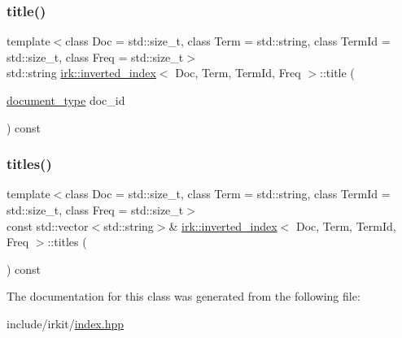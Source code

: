 \mbox{\label{classirk_1_1inverted__index_aa2aa71522e78ec5e29fa30b56c434702}} 
\subsubsection{\texorpdfstring{title()}{title()}}
{\footnotesize\ttfamily template$<$class Doc  = std\+::size\+\_\+t, class Term  = std\+::string, class Term\+Id  = std\+::size\+\_\+t, class Freq  = std\+::size\+\_\+t$>$ \\
std\+::string \mbox{\hyperlink{classirk_1_1inverted__index}{irk\+::inverted\+\_\+index}}$<$ Doc, Term, Term\+Id, Freq $>$\+::title (\begin{DoxyParamCaption}\item[{\mbox{\hyperlink{classirk_1_1inverted__index_ab708a9d1605de705341f3ed81bd7d5e7}{document\+\_\+type}}}]{doc\+\_\+id }\end{DoxyParamCaption}) const\hspace{0.3cm}{\ttfamily [inline]}}

\mbox{\label{classirk_1_1inverted__index_ac3c5100fced55578e115553c8cda9080}} 
\subsubsection{\texorpdfstring{titles()}{titles()}}
{\footnotesize\ttfamily template$<$class Doc  = std\+::size\+\_\+t, class Term  = std\+::string, class Term\+Id  = std\+::size\+\_\+t, class Freq  = std\+::size\+\_\+t$>$ \\
const std\+::vector$<$std\+::string$>$\& \mbox{\hyperlink{classirk_1_1inverted__index}{irk\+::inverted\+\_\+index}}$<$ Doc, Term, Term\+Id, Freq $>$\+::titles (\begin{DoxyParamCaption}{ }\end{DoxyParamCaption}) const\hspace{0.3cm}{\ttfamily [inline]}}



The documentation for this class was generated from the following file\+:\begin{DoxyCompactItemize}
\item 
include/irkit/\mbox{\hyperlink{index_8hpp}{index.\+hpp}}\end{DoxyCompactItemize}

